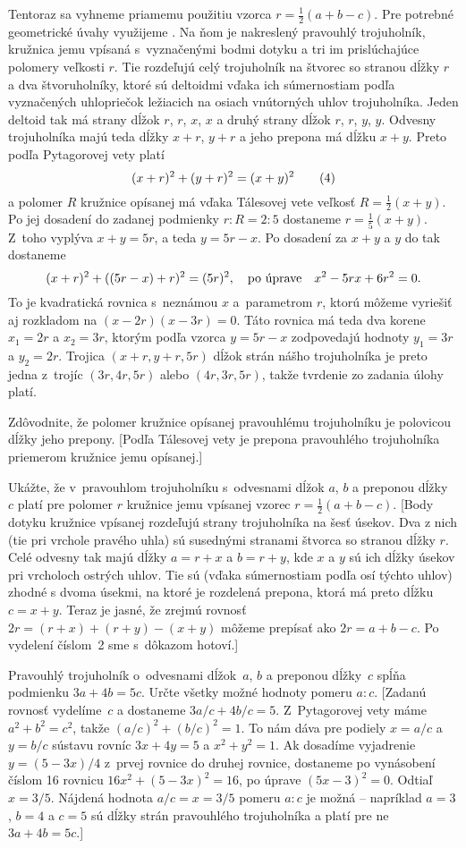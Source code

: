 {\ineriesenie
Tentoraz sa vyhneme priamemu použitiu vzorca $r=\frac12(a+b-c)$.
Pre potrebné geometrické úvahy využijeme \obr{}.
Na ňom je nakreslený pravouhlý trojuholník, kružnica jemu vpísaná
s~vyznačenými bodmi dotyku a tri im prislúchajúce polomery veľkosti $r$.
Tie rozdeľujú celý trojuholník na štvorec so stranou dĺžky $r$ a dva
štvoruholníky, ktoré sú deltoidmi vďaka ich súmernostiam
podľa vyznačených uhlopriečok ležiacich na osiach vnútorných uhlov trojuholníka.
Jeden deltoid tak má strany
dĺžok $r$, $r$, $x$, $x$ a druhý strany dĺžok $r$, $r$, $y$, $y$.
Odvesny trojuholníka majú teda dĺžky $x+r$, $y+r$ a jeho prepona
má dĺžku $x+y$. Preto podľa Pytagorovej vety platí
$$
(x+r)^2+(y+r)^2=(x+y)^2
\tag4
$$
a polomer $R$ kružnice opísanej má vďaka Tálesovej vete veľkosť
$R=\frac12(x+y)$. Po jej dosadení do zadanej podmienky
$r:R=2:5$ dostaneme $r=\frac15(x+y)$.
Z~toho vyplýva $x+y=5r$, a teda $y=5r-x$. Po dosadení
za $x+y$ a $y$ do  tak dostaneme
$$
(x+r)^2+((5r-x)+r)^2=(5r)^2,\quad\hbox{po úprave}\quad
x^2-5rx+6r^2=0.
$$
To je kvadratická rovnica s~neznámou $x$ a~parametrom $r$,
ktorú môžeme vyriešiť aj rozkladom na $(x-2r)(x-3r)=0$.
Táto rovnica má teda dva korene $x_1=2r$ a $x_2=3r$, ktorým podľa
vzorca $y=5r-x$ zodpovedajú hodnoty $y_1=3r$ a $y_2=2r$. Trojica
$(x+r,y+r,5r)$ dĺžok strán nášho trojuholníka je preto jedna z~trojíc
$(3r,4r,5r)$ alebo $(4r,3r,5r)$, takže tvrdenie zo zadania úlohy
platí.
%


Zdôvodnite, že polomer kružnice opísanej
pravouhlému trojuholníku je polovicou dĺžky jeho prepony.
[Podľa Tálesovej vety je prepona pravouhlého trojuholníka priemerom
kružnice jemu opísanej.]

Ukážte, že v~pravouhlom trojuholníku s~odvesnami dĺžok $a$, $b$
a preponou dĺžky~$c$ platí pre polomer $r$ kružnice jemu vpísanej
vzorec $r=\frac12(a+b-c)$.
[Body dotyku kružnice vpísanej rozdeľujú strany trojuholníka na šesť
úsekov. Dva z nich (tie pri vrchole pravého uhla) sú susednými stranami
štvorca so stranou dĺžky $r$. Celé odvesny tak
majú dĺžky $a=r+x$ a $b=r+y$, kde $x$ a $y$ sú ich dĺžky
úsekov pri vrcholoch ostrých uhlov. Tie sú (vďaka súmernostiam podľa osí
týchto uhlov) zhodné s dvoma úsekmi, na ktoré je rozdelená
prepona, ktorá má preto dĺžku $c=x+y$. Teraz je jasné,
že zrejmú rovnosť $2r=(r+x)+(r+y)-(x+y)$ môžeme prepísať
ako $2r=a+b-c$. Po vydelení číslom~2 sme s~dôkazom hotoví.]

Pravouhlý trojuholník o~odvesnami dĺžok~$a$, $b$ a preponou dĺžky~$c$
spĺňa podmienku $3a+4b=5c$.
Určte všetky možné hodnoty pomeru $a:c$.
[Zadanú rovnosť vydelíme~$c$ a dostaneme $3a/c+4b/c=5$.
Z~Pytagorovej vety máme $a^2+b^2=c^2$, takže $(a/c)^2+(b/c)^2=1$.
To nám dáva pre podiely $x=a/c$ a $y=b/c$ sústavu rovníc $3x+4y=5$ a
$x^2+y^2=1$. Ak dosadíme vyjadrenie~$y=(5-3x)/4$ z~prvej rovnice
do druhej rovnice, dostaneme po vynásobení číslom 16 rovnicu
$16x^2+(5-3x)^2=16$, po úprave $(5x-3)^2=0$. Odtiaľ $x=3/5$.
Nájdená hodnota $a/c=x=3/5$ pomeru $a:c$ je možná -- napríklad
$a=3$, $b=4$ a $c=5$ sú dĺžky strán pravouhlého trojuholníka a platí
pre ne $3a+4b=5c$.]

}
